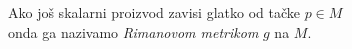 \documentclass[preview]{standalone}
\begin{document}
\begin{center}
Ako još skalarni proizvod zavisi glatko od tačke \(p \in M\)\\
        onda ga nazivamo \emph{Rimanovom metrikom} \(g\) na \(M\).
\end{center}
\end{document}
